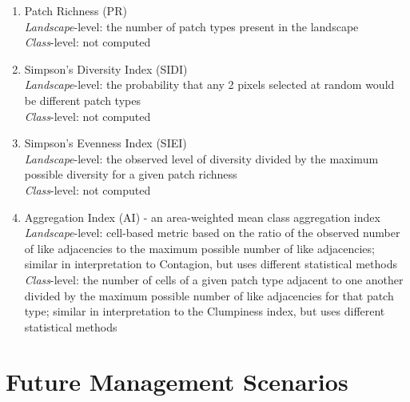 \begin{itemize}
\begin{enumerate}
		\item Patch Richness (PR)\\
		\emph{Landscape}-level: the number of patch types present in the landscape	\\
		\emph{Class}-level: not computed \\
		
		\item Simpson's Diversity Index (SIDI)\\
		\emph{Landscape}-level: the probability that any 2 pixels selected at random would be different patch types	\\
		\emph{Class}-level: not computed\\
		
		\item Simpson's Evenness Index (SIEI) \\
		\emph{Landscape}-level:  the observed level of diversity divided by the maximum possible diversity for a given patch richness 	\\
		\emph{Class}-level: not computed\\
		
		\item Aggregation Index (AI) - an area-weighted mean class aggregation index \\
		\emph{Landscape}-level: cell-based metric based on the ratio of the observed number of like adjacencies to the maximum possible number of like adjacencies; similar in interpretation to Contagion, but uses different statistical methods
		\emph{Class}-level: the number of cells of a given patch type adjacent to one another divided by the maximum possible number of like adjacencies for that patch type; similar in interpretation to the Clumpiness index, but uses different statistical methods	\\
	\end{enumerate}

\end{itemize}

\section{Future Management Scenarios}

